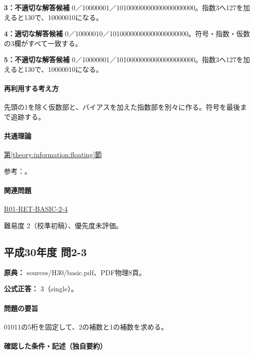 \noindent\textbf{3：不適切な解答候補} 0／10000001／10100000000000000000000。指数3へ127を加えると130で、10000010になる。\par

\noindent\textbf{4：適切な解答候補} 0／10000010／10100000000000000000000。符号・指数・仮数の3欄がすべて一致する。\par

\noindent\textbf{5：不適切な解答候補} 0／10000001／10100000000000000000000。指数3へ127を加えると130で、10000010になる。\par

\paragraph{再利用する考え方} 先頭の1を除く仮数部と、バイアスを加えた指数部を別々に作る。符号を最後まで追跡する。

\paragraph{共通理論} \hyperref[theory:information:floating]{第\ref*{theory:information:floating}節}

\par 参考：\cite{oracle_single}。

\paragraph{関連問題} \hyperref[q:r01-ret-basic-2-4]{R01-RET-BASIC-2-4}

\par 難易度 2（校準初稿）、優先度未評価。

\subsection{平成30年度 問2-3}
\label{q:h30-reg-basic-2-3}

\noindent\textbf{原典：} sources/H30/basic.pdf、PDF物理8頁。

\textbf{公式正答：} 3（single）。

\paragraph{問題の要旨} 01011の5桁を固定して、2の補数と1の補数を求める。

\paragraph{確認した条件・記述（独自要約）}\mbox{}\par

